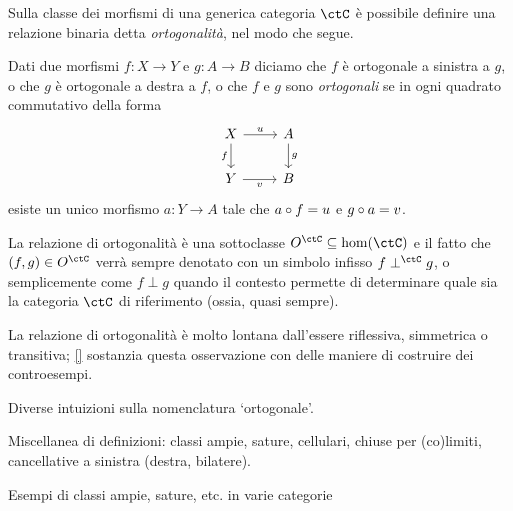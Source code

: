 \medskip
Sulla classe dei morfismi di una generica categoria \(\ctC\) è possibile definire una relazione binaria detta \emph{ortogonalità}, nel modo che segue.
\begin{definition}\label{def_ortogona}
	Dati due morfismi \(f : X\to Y\) e \(g : A\to B\) diciamo che \(f\) è ortogonale a sinistra a \(g\), o che \(g\) è ortogonale a destra a \(f\), o che \(f\) e \(g\) sono \emph{ortogonali} se in ogni quadrato commutativo della forma
	\[
		\begin{tikzcd}
			X \ar[d, "f"']\ar[r, "u"]& A\ar[d, "g"] \\
			Y \ar[r, "v"']& B
		\end{tikzcd}
	\]
	esiste un unico morfismo \(a : Y\to A\) tale che \(a\circ f=u\) e \(g\circ a=v\).
\end{definition}
La relazione di ortogonalità è una sottoclasse \(O^\ctC \subseteq \hom(\ctC)\) e il fatto che \((f,g)\in O^\ctC\) verrà sempre denotato con un simbolo infisso \(f\perp^\ctC g\), o semplicemente come \(f\perp g\) quando il contesto permette di determinare quale sia la categoria \(\ctC\) di riferimento (ossia, quasi sempre).

La relazione di ortogonalità è molto lontana dall'essere riflessiva, simmetrica o transitiva; \ref{} sostanzia questa osservazione con delle maniere di costruire dei controesempi.
\begin{remark}\label{perche_ortogonale}
	Diverse intuizioni sulla nomenclatura `ortogonale'.
\end{remark}
\begin{definition}
	Miscellanea di definizioni: classi ampie, sature, cellulari, chiuse per (co)limiti, cancellative a sinistra (destra, bilatere).
\end{definition}
\begin{examples}
	Esempi di classi ampie, sature, etc. in varie categorie
\end{examples}
